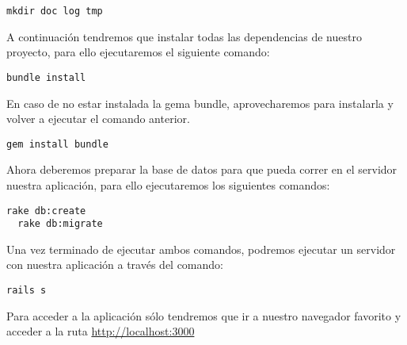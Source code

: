 \begin{lstlisting}[style=consola]
  mkdir doc log tmp
\end{lstlisting}

A continuación tendremos que instalar todas las dependencias de nuestro
proyecto, para ello ejecutaremos el siguiente comando:

\begin{lstlisting}[style=consola]
  bundle install
\end{lstlisting}

En caso de no estar instalada la gema bundle, aprovecharemos para instalarla y
volver a ejecutar el comando anterior.

\begin{lstlisting}[style=consola]
  gem install bundle
\end{lstlisting}

Ahora deberemos preparar la base de datos para que pueda correr en el servidor
nuestra aplicación, para ello ejecutaremos los siguientes comandos:

\begin{lstlisting}[style=consola]
  rake db:create 
  rake db:migrate
\end{lstlisting}

Una vez terminado de ejecutar ambos comandos, podremos ejecutar un servidor con
nuestra aplicación a través del comando:

\begin{lstlisting}[style=consola]
  rails s
\end{lstlisting}

Para acceder a la aplicación sólo tendremos que ir a nuestro navegador favorito
y acceder a la ruta \url{http://localhost:3000}
